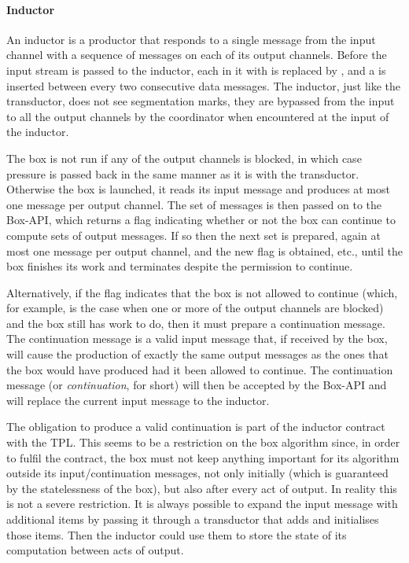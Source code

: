\documentclass[11pt]{report}
\begin{document}
\paragraph{Inductor}
An inductor is a productor that responds to a single message from the input channel with a sequence of messages on each of its output channels.
Before the input stream is passed to the inductor, each  in it with  is replaced by , and a  is inserted
between every two consecutive data messages.  The inductor, just like the transductor, does not see segmentation marks, they are bypassed from
the input to all the output channels by the coordinator when encountered at the input of the inductor.

The box is not run if any of the output channels is blocked, in which case pressure is passed back in the same manner as it is with the transductor. Otherwise
the box is launched, it reads its input message and produces at most one message per output channel. The set of messages is then passed on to the Box-API,
which returns a flag indicating whether or not the box can continue to compute sets of output messages. If so then the next set is prepared, again at most one message per output channel, and the new flag is obtained, etc., until the box finishes its work and terminates despite the permission to continue.

Alternatively, if the flag indicates that the box is not allowed to continue
(which, for example, is the case when one or more of the output channels are blocked) and the box still has work to do,
then it must prepare a continuation message. The continuation message is a valid input message that, if received by the box, will cause the production
of exactly the same output messages as the ones that the box would have produced had it been allowed to continue.
The continuation message (or {\it continuation}, for short) will then be accepted by the Box-API and will replace the current
input message to the inductor.

The obligation to produce a valid continuation is part of the inductor contract with the TPL. This seems to be a restriction on the box
algorithm since, in order to fulfil the contract, the box must not keep anything important for its algorithm outside its input/continuation messages, not only
initially (which is guaranteed by the statelessness of the box), but also after every act of output. In reality this is not a severe restriction.
It is always possible to expand the input message with additional items by passing it through a transductor that adds and initialises those items.
Then the inductor could use them to store the state of its computation between acts of output.
\end{document}
